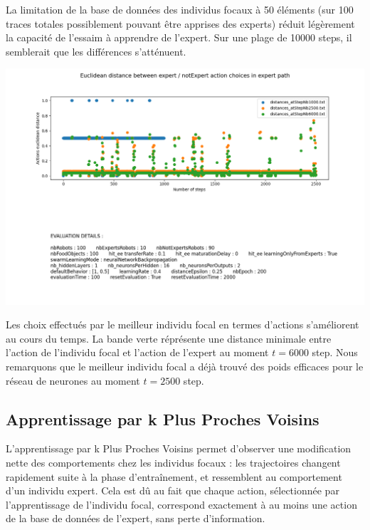 \documentclass[a4paper, 12pt]{report}
\begin{document}
    La limitation de la base de données des individus focaux à 50 éléments (sur 100 traces totales possiblement pouvant être apprises des experts) réduit légèrement la capacité de l'essaim à apprendre de l'expert. 
    Sur une plage de 10000 steps, il semblerait que les différences s'atténuent.


    \includegraphics[scale=0.5]{distances_bp.png}


    Les choix effectués par le meilleur individu focal en termes d'actions s'améliorent au cours du temps. La bande verte réprésente une distance minimale entre l'action de l'individu focal et l'action de l'expert au moment $t = 6000$ step.
    Nous remarquons que le meilleur individu focal a déjà trouvé des poids efficaces pour le réseau de neurones au moment $t = 2500$ step. 





    \subsection{Apprentissage par k Plus Proches Voisins}
    
    L'apprentissage par k Plus Proches Voisins permet d'observer une modification nette des comportements chez les individus focaux : les trajectoires changent rapidement suite à la phase d'entraînement, et ressemblent au comportement d'un individu expert. Cela est dû au fait que chaque action, sélectionnée par l'apprentissage de l'individu focal, correspond exactement à au moins une action de la base de données de l'expert, sans perte d'information.
    
\end{document}
